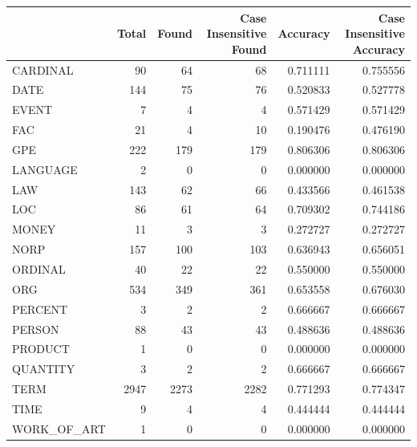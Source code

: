 \begin{tabular}{lrrrrr}
\toprule
 & Total & Found & Case Insensitive Found & Accuracy & Case Insensitive Accuracy \\
\midrule
CARDINAL & 90 & 64 & 68 & 0.711111 & 0.755556 \\
DATE & 144 & 75 & 76 & 0.520833 & 0.527778 \\
EVENT & 7 & 4 & 4 & 0.571429 & 0.571429 \\
FAC & 21 & 4 & 10 & 0.190476 & 0.476190 \\
GPE & 222 & 179 & 179 & 0.806306 & 0.806306 \\
LANGUAGE & 2 & 0 & 0 & 0.000000 & 0.000000 \\
LAW & 143 & 62 & 66 & 0.433566 & 0.461538 \\
LOC & 86 & 61 & 64 & 0.709302 & 0.744186 \\
MONEY & 11 & 3 & 3 & 0.272727 & 0.272727 \\
NORP & 157 & 100 & 103 & 0.636943 & 0.656051 \\
ORDINAL & 40 & 22 & 22 & 0.550000 & 0.550000 \\
ORG & 534 & 349 & 361 & 0.653558 & 0.676030 \\
PERCENT & 3 & 2 & 2 & 0.666667 & 0.666667 \\
PERSON & 88 & 43 & 43 & 0.488636 & 0.488636 \\
PRODUCT & 1 & 0 & 0 & 0.000000 & 0.000000 \\
QUANTITY & 3 & 2 & 2 & 0.666667 & 0.666667 \\
TERM & 2947 & 2273 & 2282 & 0.771293 & 0.774347 \\
TIME & 9 & 4 & 4 & 0.444444 & 0.444444 \\
WORK_OF_ART & 1 & 0 & 0 & 0.000000 & 0.000000 \\
\bottomrule
\end{tabular}
